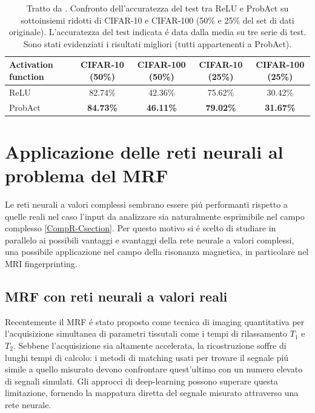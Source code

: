 \documentclass[a4paper,12pt]{report}
\begin{document}
  \begin{table}[h]\caption{Tratto da \cite{lee2019probact}. Confronto dell'accuratezza del test tra ReLU e ProbAct su sottoinsiemi ridotti di CIFAR-10 e CIFAR-100 (50\% e 25\% del set di dati originale). L'accuratezza del test indicata \'e data dalla media su tre serie di test. Sono stati evidenziati i risultati migliori (tutti appartenenti a ProbAct).} \label{PartialDatasetTab}
   \centering
   \begin{tabular}[h]{|l|c|c|c|c|}
    \hline
    Activation function & CIFAR-10 (50\%) & CIFAR-100 (50\%) & CIFAR-10 (25\%) & CIFAR-100 (25\%) \\ \hline
    ReLU & 82.74\% & 42.36\% & 75.62\% & 30.42\% \\ 
    ProbAct & \textbf{84.73\%} & \textbf{46.11\%} & \textbf{79.02\%} & \textbf{31.67\%} \\ \hline
   \end{tabular}
  \end{table}
 
 
 \chapter*{Applicazione delle reti neurali al problema del MRF}\label{MRIsection}
 
 Le reti neurali a valori complessi sembrano essere pi\'u performanti rispetto a quelle reali nel caso l'input da analizzare sia naturalmente esprimibile nel campo complesso \ref{CompR-Csection}. 
 Per questo motivo si \'e scelto di studiare in parallelo ai possibili vantaggi e svantaggi della rete neurale a valori complessi, una possibile applicazione nel campo della risonanza magnetica, in particolare nel MRI fingerprinting.
 
 \section{MRF con reti neurali a valori reali}
 
 Recentemente il MRF \'e stato proposto come tecnica di imaging quantitativa per l'acquisizione simultanea di parametri tissutali come i tempi di rilassamento $T_1$ e $T_2$. 
 Sebbene l'acquisizione sia altamente accelerata, la ricostruzione soffre di lunghi tempi di calcolo: i metodi di matching usati per trovare il segnale pi\'u simile a quello misurato devono confrontare quest'ultimo con un numero elevato di segnali simulati. 
 Gli approcci di deep-learning possono superare questa limitazione, fornendo la mappatura diretta del segnale misurato attraverso una rete neurale. 
 
\end{document}
